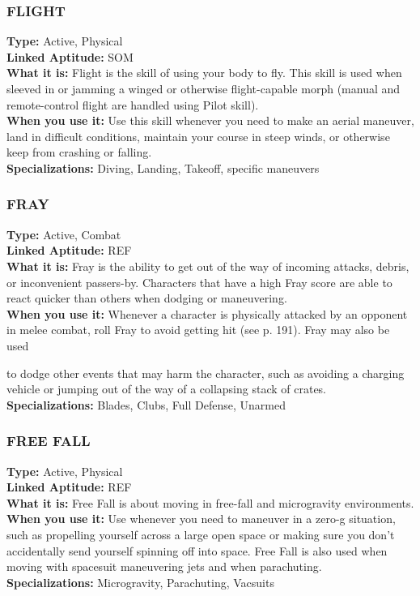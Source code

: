 \subsubsection{FLIGHT} \textbf{Type:} Active, Physical \\ \textbf{Linked Aptitude:} SOM \\ \textbf{What it is:} Flight is the skill of using your body to fly. This skill is used when sleeved in or jamming a winged or otherwise flight-capable morph (manual and remote-control flight are handled using Pilot skill). \\ \textbf{When you use it:} Use this skill whenever you need to make an aerial maneuver, land in difficult conditions, maintain your course in steep winds, or otherwise keep from crashing or falling. \\ \textbf{Specializations:} Diving, Landing, Takeoff, specific maneuvers 

\subsubsection{FRAY} \textbf{Type:} Active, Combat \\ \textbf{Linked Aptitude:} REF \\ \textbf{What it is:} Fray is the ability to get out of the way of incoming attacks, debris, or inconvenient passers-by. Characters that have a high Fray score are able to react quicker than others when dodging or maneuvering. \\ \textbf{When you use it:} Whenever a character is physically attacked by an opponent in melee combat, roll Fray to avoid getting hit (see p. 191). Fray may also be used 

to dodge other events that may harm the character, such as avoiding a charging vehicle or jumping out of the way of a collapsing stack of crates. \\ \textbf{Specializations:} Blades, Clubs, Full Defense, Unarmed 

\subsubsection{FREE FALL} \textbf{Type:} Active, Physical \\ \textbf{Linked Aptitude:} REF \\ \textbf{What it is:} Free Fall is about moving in free-fall and microgravity environments. \\ \textbf{When you use it:} Use whenever you need to maneuver in a zero-g situation, such as propelling yourself across a large open space or making sure you don’t accidentally send yourself spinning off into space. Free Fall is also used when moving with spacesuit maneuvering jets and when parachuting. \\ \textbf{Specializations:} Microgravity, Parachuting, Vacsuits 

